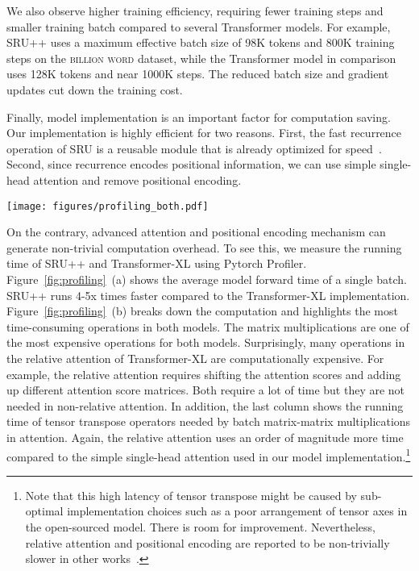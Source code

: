 We also observe higher training efficiency, requiring fewer training steps and smaller training batch compared to several Transformer models.
For example, SRU++ uses a maximum effective batch size of 98K tokens and 800K training steps on the \textsc{billion word} dataset, while the Transformer model in comparison~\cite{baevski2018adaptive} uses 128K tokens and near 1000K steps.
The reduced batch size and gradient updates cut down the training cost.

Finally, model implementation is an important factor for computation saving.
Our implementation is highly efficient for two reasons.
First, the fast recurrence operation of SRU is a reusable module that is already optimized for speed~\cite{lei2018sru}.
Second, since recurrence encodes positional information, we can use simple single-head attention and remove positional encoding.

\begin{figure*}[!t]
\texttt{[image: figures/profiling\_both.pdf]}
    \caption{Profiling of SRU++ and Transformer-XL: (a) forward time (in milliseconds) of small and large models and (b) forward time used in various types of time-consuming operations. We use a single GPU for profiling to avoid extra overhead such as data synchronization between GPUs. We use an unroll size / context length $M=512$ and $1024$ respectively for small and large models. All models use a batch size $B=16$ for profiling.}
    \label{fig:profiling}
\end{figure*}

On the contrary, advanced attention and positional encoding mechanism can generate non-trivial computation overhead.
To see this, we measure the running time of SRU++ and Transformer-XL using Pytorch Profiler. 
Figure~\ref{fig:profiling}~(a) shows the average model forward time of a single batch.
SRU++ runs 4-5x times faster compared to the Transformer-XL implementation. 
Figure~\ref{fig:profiling}~(b) breaks down the computation and highlights the most time-consuming operations in both models.
The matrix multiplications are one of the most expensive operations for both models.
Surprisingly, many operations in the relative attention of Transformer-XL are computationally expensive.
For example, the relative attention requires shifting the attention scores and adding up different attention score matrices.
Both require a lot of time but they are not needed in non-relative attention.
In addition, the last column shows the running time of tensor transpose operators needed by batch matrix-matrix multiplications in attention.
Again, the relative attention uses an order of magnitude more time compared to the simple single-head attention used in our model implementation.\footnote{Note that this high latency of tensor transpose might be caused by sub-optimal implementation choices such as a poor arrangement of tensor axes in the open-sourced model. There is room for improvement. Nevertheless, relative attention and positional encoding are reported to be non-trivially slower in other works~\cite{shaw-etal-2018-self,tian2021shatter}.}

